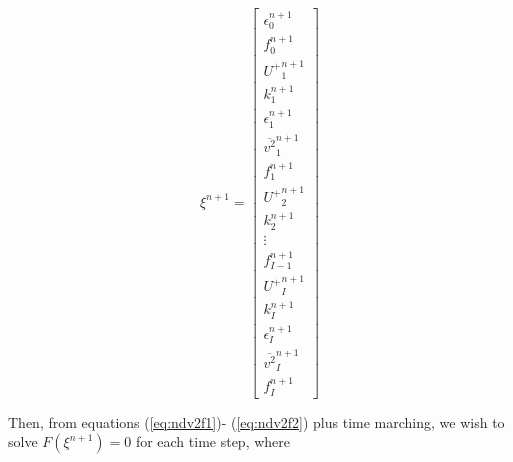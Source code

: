 \documentclass[12pt]{article}
\newcommand{\ep}{\epsilon} \newcommand{\noi}{\noindent}
\begin{document}
\[ \xi^{n+1} = \left[ \begin{matrix} \ep^{n+1}_0 \\ f^{n+1}_0 \\
		{U^+}_1^{n+1} \\ k_1^{n+1} \\ \ep_1^{n+1} \\
	{\overline{v^2}}_1^{n+1} \\ f_{1}^{n+1} \\ {U^+}_2^{n+1} \\
	k_2^{n+1} \\ \vdots \\ f_{I-1}^{n+1} \\ {U^+}_I^{n+1} \\ k_I^{n+1} \\ \ep_I^{n+1} \\
{\overline{v^2}}_I^{n+1} \\ f_I^{n+1} \end{matrix} \right] \]  

\noi Then, from equations
(\ref{eq:ndv2f1})- (\ref{eq:ndv2f2}) plus time marching, we wish to solve
$F(\xi^{n+1})=0$ for each time step, where  
\end{document}
